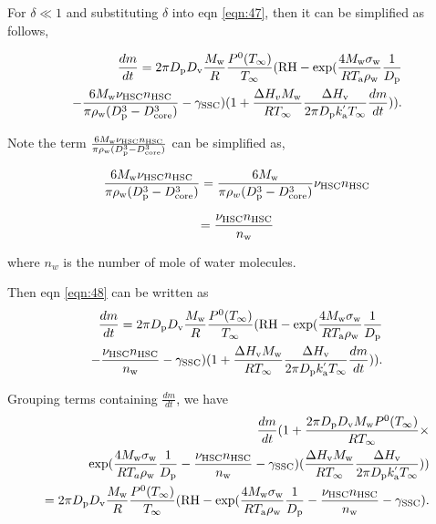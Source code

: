 \documentclass[12pt]{article}
\begin{document}
For $\delta \ll 1$ and substituting $\delta$ into eqn \ref{eqn:47}, then it  can be simplified as follows, 

\begin{eqnarray}\label{eqn:48}
\frac{dm}{dt}=2 \pi D_{\rm p} D_{\rm v}  \frac{M_{\rm w}}{R} \frac{P^{\rm 0}(T_{\infty})} {T_{\infty}} (\textrm{RH} - \exp( \frac{4 M_{\rm w}\sigma_{\rm w}}{R T_{\rm a} 
\rho_{\rm w}} \frac{1}{D_{\rm p}}\\ \nonumber 
-\frac{6M_{\rm w}\nu_{\rm HSC}n_{\rm HSC}}{\pi \rho_{\rm w}(D_{\rm p}^{3}-D_{\rm core}^{3})}-\gamma_{\rm SSC})(1+\frac{\Delta H_{v} M_{\rm w}}{R T_{\infty}} \frac{\Delta H_{\rm v}}{2 \pi D_{\rm p} k^{'}_{\rm a} T_{\infty}} \frac{dm}{dt})). \nonumber
\end{eqnarray}

Note the term $\frac{6M_{\rm w}\nu_{\rm HSC}n_{\rm HSC}}{\pi \rho_{\rm w}(D_{\rm p}^{3}-D_{\rm core}^{3})}$ can be simplified as,

\begin{equation}\label{eqn:49}
\frac{6M_{\rm w}\nu_{\rm HSC}n_{\rm HSC}}{\pi \rho_{\rm w}(D_{\rm p}^{3}-D_{\rm core}^{3})}=\frac{6M_{\rm w}}{\pi \rho_{w}(D_{\rm p}^{3}-D_{\rm core}^{3})}\nu_{\rm HSC}n_{\rm HSC}
\end{equation}

\begin{equation}\label{eqn:50}
=\frac{\nu_{\rm HSC}n_{\rm HSC}}{n_{\rm w}}
\end{equation}

where $n_{w}$ is the number of mole of water molecules. 

Then eqn \ref{eqn:48} can be written as 
\begin{eqnarray}\label{eqn:51}
\frac{dm}{dt}=2 \pi D_{\rm p} D_{\rm v}  \frac{M_{\rm w}}{R} \frac{P^{\rm 0}(T_{\infty})} {T_{\infty}} 
(\textrm{RH} - \exp( \frac{4 M_{\rm w} \sigma_{\rm w}}{R T_{\rm a} \rho_{\rm w}} \frac{1}{D_{\rm p}}\\ \nonumber
-\frac{\nu_{\rm HSC}n_{\rm HSC}}{n_{\rm w}}-\gamma_{\rm SSC})(1+\frac{\Delta H_{\rm v} M_{\rm w}}{R T_{\infty}} \frac{\Delta H_{\rm v}}{2 \pi D_{\rm p} k^{'}_{\rm a} T_{\infty}} \frac{dm}{dt})). \nonumber
\end{eqnarray}

Grouping terms containing $\frac{dm}{dt}$, we have  
\begin{eqnarray}\label{eqn:52}
\frac{dm}{dt}(1+\frac{2 \pi D_{\rm p} D_{\rm v} M_{\rm w} P^{\rm 0}(T_{\infty})}{R T_{\infty}} \times \\  \nonumber
\exp(\frac{4 M_{\rm w}\sigma_{\rm w}}{R T_{a} \rho_{\rm w}} \frac{1}{D_{\rm p}}- \frac{\nu_{\rm HSC}n_{\rm HSC}} {n_{\rm w}}-\gamma_{\rm SSC})(\frac{\Delta H_{\rm v} M_{\rm w}} {R T_{\infty}}\frac{\Delta H_{\rm v}}{2 \pi D_{\rm p} k^{'}_{\rm a} T_{\infty}})) \\  \nonumber
=2 \pi D_{\rm p} D_{\rm v}  \frac{M_{\rm w}}{R} \frac{P^{\rm 0}(T_{\infty})} {T_{\infty}} 
(\textrm{RH}-\exp( \frac{4 M_{\rm w}\sigma_{\rm w}}{R T_{\rm a} \rho_{\rm w}}\frac{1}{D_{\rm p}}-\frac{\nu_{\rm HSC}n_{\rm HSC}}{n_{\rm w}}-\gamma_{\rm SSC}). \nonumber
\end{eqnarray}
\end{document}
